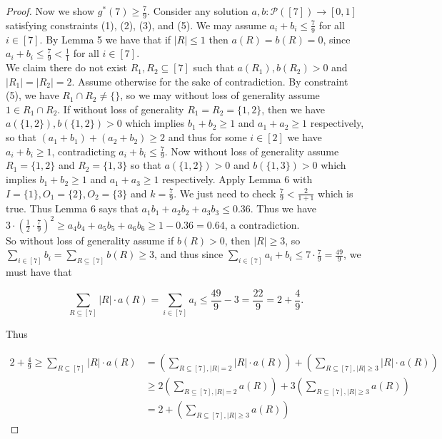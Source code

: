 \documentclass{article}
\begin{document}
\begin{proof}
Now we show $g^*(7) \geq \frac{7}{9}$. Consider any solution $a,b : \mathcal{P}([7]) \rightarrow [0,1]$ satisfying constraints (1), (2), (3), and (5). We may assume $a_i + b_i \leq \frac{7}{9}$ for all $i \in [7]$. By Lemma 5 we have that if $|R| \leq 1$ then $a(R) = b(R) = 0$, since $a_i + b_i \leq \frac{7}{9} < \frac{1}{1}$ for all $i \in [7]$. \\

We claim there do not exist $R_1,R_2 \subseteq [7]$ such that $a(R_1), b(R_2) > 0$ and $|R_1|=|R_2| = 2$. Assume otherwise for the sake of contradiction. By constraint (5), we have $R_1 \cap R_2 \neq \{\}$, so we may without loss of generality assume $1 \in R_1 \cap R_2$. If without loss of generality $R_1 = R_2 = \{1,2\}$, then we have $a(\{1,2\}),b(\{1,2\}) > 0$ which implies $b_1+b_2 \geq 1$ and $a_1+a_2 \geq 1$ respectively, so that $(a_1+b_1) + (a_2+b_2) \geq 2$ and thus for some $i \in [2]$ we have $a_i+b_i \geq 1$, contradicting $a_i+b_i \leq \frac{7}{9}$. Now without loss of generality assume $R_1 = \{1,2\}$ and $R_2 = \{1,3\}$ so that $a(\{1,2\}) > 0$ and $b(\{1,3\}) > 0$ which implies $b_1 + b_2 \geq 1$ and $a_1 + a_3 \geq 1$ respectively. Apply Lemma 6 with $I = \{1\}, O_1 = \{2\}, O_2 = \{3\}$ and $k = \frac{7}{9}$. We just need to check $\frac{7}{9} < \frac{2}{1+1}$ which is true. Thus Lemma 6 says that $a_1b_1 + a_2b_2 + a_3b_3 \leq 0.36$. Thus we have $ 3 \cdot (\frac{1}{2} \cdot \frac{7}{9})^2 \geq a_4b_4 + a_5b_5 + a_6b_6 \geq 1-0.36 = 0.64$, a contradiction. \\

So without loss of generality assume if $b(R) > 0$, then $|R| \geq 3$, so $\sum_{i \in [7]} b_i = \sum_{R \subseteq [7]} b(R) \geq 3$, and thus since $\sum_{i \in [7]} a_i + b_i \leq 7 \cdot \frac{7}{9} = \frac{49}{9}$, we must have that 

$$\sum_{R \subseteq [7]} |R| \cdot a(R) = \sum_{i \in [7]} a_i \leq \frac{49}{9} - 3 = \frac{22}{9} = 2+ \frac{4}{9}.$$

\noindent
Thus

\begin{align*}
2+ \frac{4}{9} \geq \sum_{R \subseteq [7]} |R| \cdot a(R) &= \left( \sum_{R \subseteq [7], |R| = 2} |R| \cdot a(R) \right) + \left( \sum_{R \subseteq [7], |R| \geq 3} |R| \cdot a(R) \right) \\
&\geq 2\left( \sum_{R \subseteq [7], |R| = 2} a(R) \right) + 3\left( \sum_{R \subseteq [7], |R| \geq 3} a(R) \right) \\
&= 2 + \left( \sum_{R \subseteq [7], |R| \geq 3} a(R) \right)
\end{align*}



\end{proof}
\end{document}
